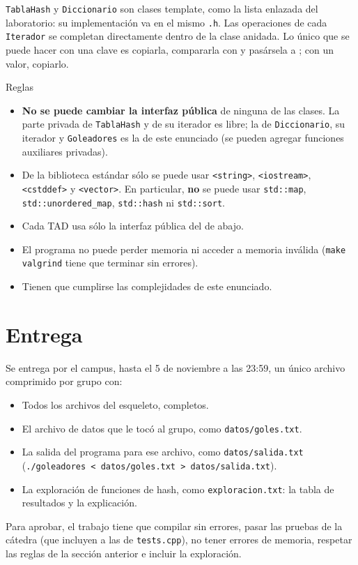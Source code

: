 \documentclass{article}
\begin{document}
\texttt{TablaHash} y \texttt{Diccionario} son clases template, como la
lista enlazada del laboratorio: su implementación va en el mismo
\texttt{.h}. Las operaciones de cada \texttt{Iterador} se completan
directamente dentro de la clase anidada. Lo único que se puede hacer con
una clave es copiarla, compararla con \cppinline{==} y pasársela a
; con un valor, copiarlo.

\begin{regla}{Reglas}
\begin{itemize}
\item \textbf{No se puede cambiar la interfaz pública} de ninguna de las
  clases. La parte privada de \texttt{TablaHash} y de su iterador es
  libre; la de \texttt{Diccionario}, su iterador y \texttt{Goleadores}
  es la de este enunciado
  (se pueden agregar funciones auxiliares privadas).
\item De la biblioteca estándar sólo se puede usar
  \texttt{<string>}, \texttt{<iostream>}, \texttt{<cstddef>} y
  \texttt{<vector>}. En particular, \textbf{no} se puede usar
  \texttt{std::map}, \texttt{std::unordered\_map}, \texttt{std::hash} ni
  \texttt{std::sort}.
\item Cada TAD usa sólo la interfaz pública del de abajo.
\item El programa no puede perder memoria ni acceder a memoria
  inválida (\texttt{make valgrind} tiene que terminar sin errores).
\item Tienen que cumplirse las complejidades de este enunciado.
\end{itemize}
\end{regla}

\section{Entrega}

Se entrega por el campus, hasta el 5 de noviembre a las 23:59, un único
archivo comprimido por grupo con:

\begin{itemize}
\item Todos los archivos del esqueleto, completos.
\item El archivo de datos que le tocó al grupo, como
  \texttt{datos/goles.txt}.
\item La salida del programa para ese archivo, como
  \texttt{datos/salida.txt}
  (\texttt{./goleadores < datos/goles.txt > datos/salida.txt}).
\item La exploración de funciones de hash, como
  \texttt{exploracion.txt}: la tabla de resultados y la explicación.
\end{itemize}

Para aprobar, el trabajo tiene que compilar sin errores, pasar las
pruebas de la cátedra (que incluyen a las de \texttt{tests.cpp}), no
tener errores de memoria, respetar las reglas de la sección anterior e
incluir la exploración.
\end{document}
